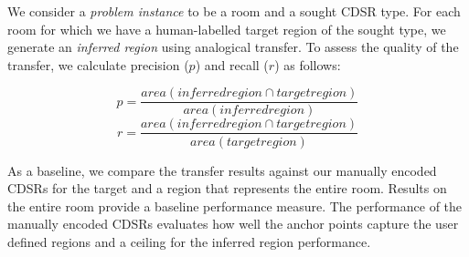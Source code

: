 We consider a \textit{problem instance} to be a room and a sought CDSR type. For each room for which we have a human-labelled target region of the sought type, we generate an \textit{inferred region} using analogical transfer. To assess the quality of the transfer, we calculate precision ($p$) and recall ($r$) as follows:

\begin{equation}
	p=\frac{area(inferred region \cap target region)}{area(inferred region)}
\end{equation}
\begin{equation}
	r=\frac{area(inferred region \cap target region)}{area(target region)}
\end{equation}


As a baseline, we compare the transfer results against our manually encoded CDSRs for the target and a region that represents the entire room. Results on the entire room provide a baseline performance measure. The performance of the manually encoded CDSRs evaluates how well the anchor points capture the user defined regions and a ceiling for the inferred region performance.








